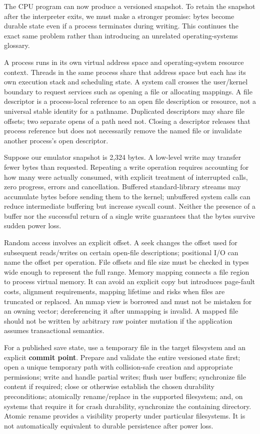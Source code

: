 The CPU program can now produce a versioned snapshot. To retain the snapshot after the interpreter exits, we must make a stronger promise: bytes become durable state even if a process terminates during writing. This continues the exact same problem rather than introducing an unrelated operating-systems glossary.

A process runs in its own virtual address space and operating-system resource context. Threads in the same process share that address space but each has its own execution stack and scheduling state. A system call crosses the user/kernel boundary to request services such as opening a file or allocating mappings. A file descriptor is a process-local reference to an open file description or resource, not a universal stable identity for a pathname. Duplicated descriptors may share file offsets; two separate opens of a path need not. Closing a descriptor releases that process reference but does not necessarily remove the named file or invalidate another process's open descriptor.

Suppose our emulator snapshot is 2,324 bytes. A low-level write may transfer fewer bytes than requested. Repeating a write operation requires accounting for how many were actually consumed, with explicit treatment of interrupted calls, zero progress, errors and cancellation. Buffered standard-library streams may accumulate bytes before sending them to the kernel; unbuffered system calls can reduce intermediate buffering but increase syscall count. Neither the presence of a buffer nor the successful return of a single write guarantees that the bytes survive sudden power loss.

Random access involves an explicit offset. A seek changes the offset used for subsequent reads/writes on certain open-file descriptions; positional I/O can name the offset per operation. File offsets and file size must be checked in types wide enough to represent the full range. Memory mapping connects a file region to process virtual memory. It can avoid an explicit copy but introduces page-fault costs, alignment requirements, mapping lifetime and risks when files are truncated or replaced. An mmap view is borrowed and must not be mistaken for an owning vector; dereferencing it after unmapping is invalid. A mapped file should not be written by arbitrary raw pointer mutation if the application assumes transactional semantics.

For a published save state, use a temporary file in the target filesystem and an explicit \textbf{commit point}. Prepare and validate the entire versioned state first; open a unique temporary path with collision-safe creation and appropriate permissions; write and handle partial writes; flush user buffers; synchronize file content if required; close or otherwise establish the chosen durability preconditions; atomically rename/replace in the supported filesystem; and, on systems that require it for crash durability, synchronize the containing directory. Atomic rename provides a visibility property under particular filesystems. It is not automatically equivalent to durable persistence after power loss.

